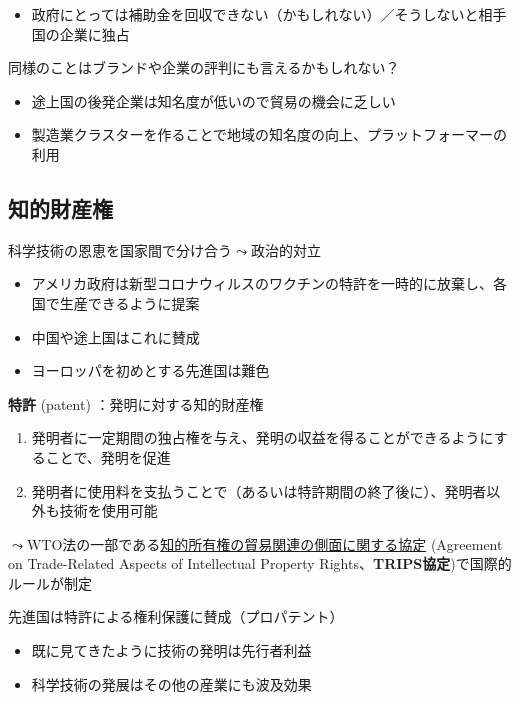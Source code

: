 \documentclass[
  xelatex,
  ja=standard]{bxjsarticle}
\providecommand{\tightlist}{%
  \setlength{\itemsep}{0pt}\setlength{\parskip}{0pt}}\usepackage{longtable,booktabs,array}
\begin{document}
\begin{itemize}
\tightlist
\item
  政府にとっては補助金を回収できない（かもしれない）／そうしないと相手国の企業に独占
\end{itemize}

同様のことはブランドや企業の評判にも言えるかもしれない？

\begin{itemize}
\tightlist
\item
  途上国の後発企業は知名度が低いので貿易の機会に乏しい
\item
  製造業クラスターを作ることで地域の知名度の向上、プラットフォーマーの利用
\end{itemize}

\hypertarget{ux77e5ux7684ux8ca1ux7523ux6a29}{%
\subsection{知的財産権}\label{ux77e5ux7684ux8ca1ux7523ux6a29}}

科学技術の恩恵を国家間で分け合う\(\leadsto\)政治的対立

\begin{itemize}
\tightlist
\item
  アメリカ政府は新型コロナウィルスのワクチンの特許を一時的に放棄し、各国で生産できるように提案
\item
  中国や途上国はこれに賛成
\item
  ヨーロッパを初めとする先進国は難色
\end{itemize}

\textbf{特許} (patent) ：発明に対する知的財産権

\begin{enumerate}
\def\labelenumi{\arabic{enumi}.}
\tightlist
\item
  発明者に一定期間の独占権を与え、発明の収益を得ることができるようにすることで、発明を促進
\item
  発明者に使用料を支払うことで（あるいは特許期間の終了後に）、発明者以外も技術を使用可能
\end{enumerate}

\(\leadsto\)WTO法の一部である\href{https://www.jpo.go.jp/system/laws/gaikoku/trips/index.html}{知的所有権の貿易関連の側面に関する協定}
(Agreement on Trade-Related Aspects of Intellectual Property
Rights、\textbf{TRIPS協定})で国際的ルールが制定

先進国は特許による権利保護に賛成（プロパテント）

\begin{itemize}
\tightlist
\item
  既に見てきたように技術の発明は先行者利益
\item
  科学技術の発展はその他の産業にも波及効果
\end{itemize}
\end{document}

